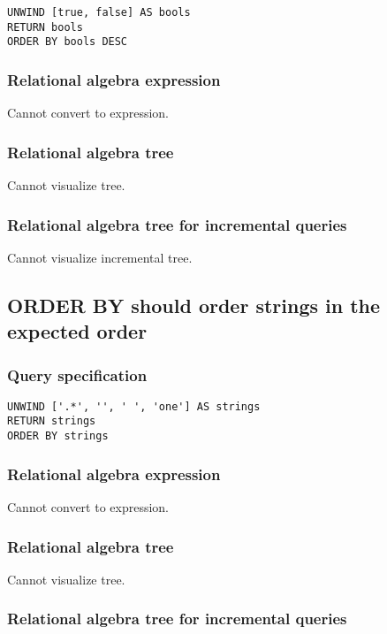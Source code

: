 \begin{lstlisting}
UNWIND [true, false] AS bools
RETURN bools
ORDER BY bools DESC
\end{lstlisting}

\subsubsection*{Relational algebra expression}

Cannot convert to expression.

\subsubsection*{Relational algebra tree}

Cannot visualize tree.

\subsubsection*{Relational algebra tree for incremental queries}

Cannot visualize incremental tree.

\subsection{ORDER BY should order strings in the expected order}

\subsubsection*{Query specification}

\begin{lstlisting}
UNWIND ['.*', '', ' ', 'one'] AS strings
RETURN strings
ORDER BY strings
\end{lstlisting}

\subsubsection*{Relational algebra expression}

Cannot convert to expression.

\subsubsection*{Relational algebra tree}

Cannot visualize tree.

\subsubsection*{Relational algebra tree for incremental queries}

